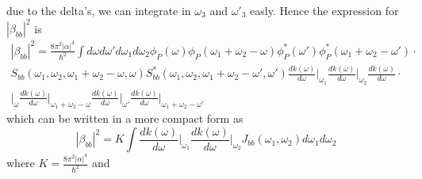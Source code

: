 due to the delta's, we can integrate in $\omega_3$ and $\omega'_3$ easly. Hence the expression for $|\beta_{bb}|^2$ is
\begin{multline}|\beta_{bb}|^2 = \frac{8\pi^2|\alpha|^4}{\hbar^2}\int  d\omega d\omega'  d\omega_1d\omega_2 \phi_P(\omega)\phi_P(\omega_1+\omega_2-\omega)\phi_P^*(\omega')\phi^*_P(\omega_1+\omega_2-\omega')\cdot \\ S_{bb}(\omega_1,\omega_2,\omega_1+\omega_2-\omega,\omega) S^*_{bb}(\omega_1,\omega_2,\omega_1+\omega_2-\omega',\omega')
\frac{dk(\omega)}{d\omega}\Bigg|_{\omega_1}\frac{dk(\omega)}{d\omega}\Bigg|_{\omega_2}\frac{dk(\omega)}{d\omega}\cdot\\\Bigg|_{\omega}\frac{dk(\omega)}{d\omega}\Bigg|_{\omega_1+\omega_2-\omega}\frac{dk(\omega)}{d\omega}\Bigg|_{\omega'} \frac{dk(\omega)}{d\omega}\Bigg|_{\omega_1+\omega_2-\omega'}\end{multline}
which can be written in a more compact form as
\begin{equation}|\beta_{bb}|^2 = K\int \frac{dk(\omega)}{d\omega}\Bigg|_{\omega_1}\frac{dk(\omega)}{d\omega}\Bigg|_{\omega_2} J_{bb}(\omega_1,\omega_2)d\omega_1 d\omega_2\end{equation}
where $K = \frac{8\pi^2|\alpha|^4}{\hbar^2}$ and 

